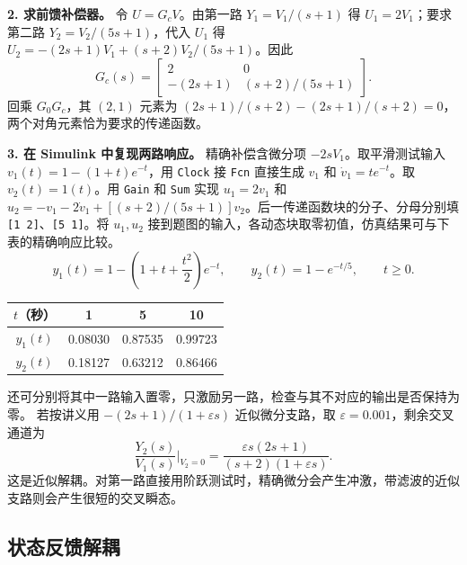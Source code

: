 \textbf{2. 求前馈补偿器。}
令 $U=G_cV$。由第一路 $Y_1=V_1/(s+1)$ 得 $U_1=2V_1$；要求第二路 $Y_2=V_2/(5s+1)$，代入 $U_1$ 得 $U_2=-(2s+1)V_1+(s+2)V_2/(5s+1)$。因此
\[
    G_c(s)=\begin{bmatrix}
        2&0\\
        -(2s+1)&(s+2)/(5s+1)
    \end{bmatrix}.
\]
回乘 $G_0G_c$，其 $(2,1)$ 元素为 $(2s+1)/(s+2)-(2s+1)/(s+2)=0$，两个对角元素恰为要求的传递函数。

\textbf{3. 在 Simulink 中复现两路响应。}
精确补偿含微分项 $-2sV_1$。取平滑测试输入 $v_1(t)=1-(1+t)e^{-t}$，用 \texttt{Clock} 接 \texttt{Fcn} 直接生成 $v_1$ 和 $\dot v_1=te^{-t}$。取 $v_2(t)=1(t)$。用 \texttt{Gain} 和 \texttt{Sum} 实现 $u_1=2v_1$ 和 $u_2=-v_1-2\dot v_1+[(s+2)/(5s+1)]v_2$。后一传递函数块的分子、分母分别填 \texttt{[1 2]}、\texttt{[5 1]}。将 $u_1,u_2$ 接到题图的输入，各动态块取零初值，仿真结果可与下表的精确响应比较。
\[
    y_1(t)=1-\left(1+t+\frac{t^2}{2}\right)e^{-t},\qquad
    y_2(t)=1-e^{-t/5},\qquad t\geq0 .
\]
\begin{center}
\begin{tabular}{c|ccc}
    $t$（秒） & 1 & 5 & 10\\
    \hline
    $y_1(t)$ & 0.08030 & 0.87535 & 0.99723\\
    $y_2(t)$ & 0.18127 & 0.63212 & 0.86466
\end{tabular}
\end{center}
还可分别将其中一路输入置零，只激励另一路，检查与其不对应的输出是否保持为零。
若按讲义用 $-(2s+1)/(1+\varepsilon s)$ 近似微分支路，取 $\varepsilon=0.001$，剩余交叉通道为
\[
    \frac{Y_2(s)}{V_1(s)}\bigg|_{V_2=0}
     =\frac{\varepsilon s(2s+1)}{(s+2)(1+\varepsilon s)} .
\]
这是近似解耦。对第一路直接用阶跃测试时，精确微分会产生冲激，带滤波的近似支路则会产生很短的交叉瞬态。

\subsection{状态反馈解耦}


